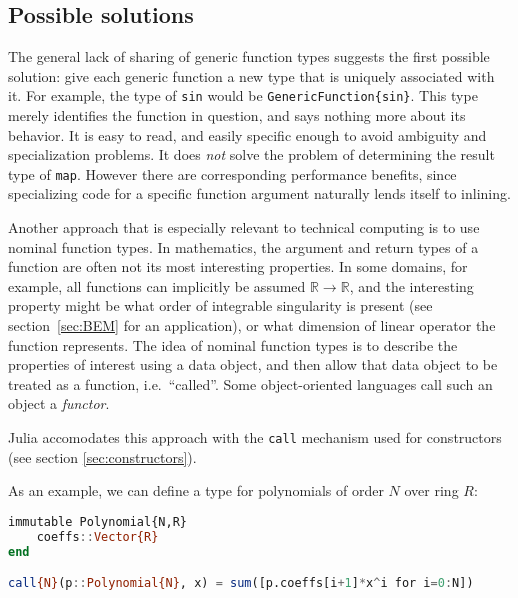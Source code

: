 \subsection{Possible solutions}

The general lack of sharing of generic function types suggests the first
possible solution: give each generic function a new type that is uniquely
associated with it. For example, the type of \texttt{sin} would be
\texttt{GenericFunction\{sin\}}. This type merely identifies the function
in question, and says nothing more about its behavior. It is easy to read,
and easily specific enough to avoid ambiguity and specialization
problems. It does \emph{not} solve the problem of
determining the result type of \texttt{map}. However there are
corresponding performance benefits, since specializing code for a
specific function argument naturally lends itself to inlining.


Another approach that is especially relevant to technical computing is to use
nominal function types.
In mathematics, the argument and return types of a function are often not
its most interesting properties.
In some domains, for example, all functions can implicitly be assumed
$\mathbb{R}\rightarrow\mathbb{R}$, and the interesting property might be
what order of integrable singularity is present (see section~\ref{sec:BEM} for
an application), or what dimension of linear operator the function represents.
The idea of nominal function types is to describe the properties of interest
using a data object, and then allow that data object to be treated as a
function, i.e.\ ``called''. Some object-oriented languages call such an object
a \emph{functor}.

Julia accomodates this approach with the \texttt{call} mechanism used for
constructors (see section \ref{sec:constructors}).

As an example, we can define a type for polynomials of order $N$ over ring
$R$:

\begin{singlespace}
\begin{lstlisting}[language=julia]
immutable Polynomial{N,R}
    coeffs::Vector{R}
end

call{N}(p::Polynomial{N}, x) = sum([p.coeffs[i+1]*x^i for i=0:N])
\end{lstlisting}
\end{singlespace}

